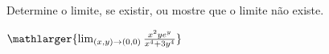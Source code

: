 Determine o limite, se existir, ou mostre que o limite não existe.

\item$\mathlarger{\lim_{(x,y)\rightarrow(0,0)} \frac{x^2ye^y}{x^4+3y^4}}$
